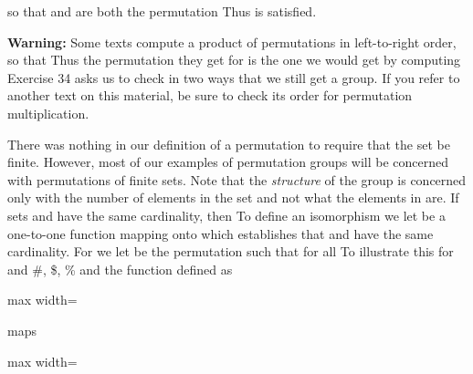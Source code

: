 \documentclass[11pt,oneside]{article}
\begin{document}
\begin{BookBody}
\noindent so that  and  are both the permutation  Thus  is satisfied. \BookEnd{\blacklozenge}

\noindent \textbf{Warning:} Some texts compute a product \BookInline{\sigma \mu } of permutations in left-to-right order, so that  Thus the permutation they get for \BookInline{\sigma \mu } is the one we would get by computing  Exercise 34 asks us to check in two ways that we still get a group. If you refer to another text on this material, be sure to check its order for permutation multiplication.

There was nothing in our definition of a permutation to require that the set  be finite. However, most of our examples of permutation groups will be concerned with permutations of finite sets. Note that the\textit{ structure} of the group  is concerned only with the number of elements in the set  and not what the elements in  are. If sets  and  have the same cardinality, then  To define an isomorphism  we let  be a one-to-one function mapping  onto  which establishes that  and  have the same cardinality. For  we let \BookInline{\phi (\sigma )} be the permutation  such that  for all  To illustrate this for  and \#, \$, \%\BookInline{\}} and the function  defined as

\begin{center}\begin{adjustbox}{max width=\linewidth}\end{adjustbox}\end{center}

\noindent \BookInline{\phi } maps

\begin{center}\begin{adjustbox}{max width=\linewidth}\end{adjustbox}\end{center}


\end{BookBody}
\end{document}
